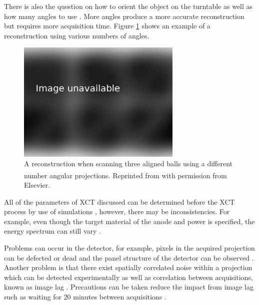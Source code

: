 There is also the question on how to orient the object on the turntable \citep{corcoran2016observations} as well as how many angles to use \citep{kruth2011computed}. More angles produce a more accurate reconstruction but requires more acquisition time. Figure \ref{fig:literature_angles} shows an example of a reconstruction using various numbers of angles.

\begin{figure}
  \centering
  \includegraphics[width=0.7\textwidth]{../figures/literatureReview/literature_angles.png}
  \caption{A reconstruction when scanning three aligned balls using a different number angular projections. Reprinted from \cite{kruth2011computed}\textsuperscript{\textcopyright} with permission from Elsevier.}
  \label{fig:literature_angles}
\end{figure}

All of the parameters of XCT discussed can be determined before the XCT process by use of simulations \citep{reisinger2011simulation, reiter2011simulation}, however, there may be inconsistencies. For example, even though the target material of the anode and power is specified, the energy spectrum can still vary \citep{stumbo2004direct}.

Problems can occur in the detector, for example, pixels in the acquired projection can be defected or dead \citep{brettschneider2014spatial} and the panel structure of the detector can be observed \citep{yang2009evaluation}. Another problem is that there exist spatially correlated noise within a projection which can be detected experimentally \citep{sun2016characterisation} as well as correlation between acquisitions, known as image lag \citep{yang2009evaluation}. Precautions can be taken reduce the impact from image lag such as waiting for 20 minutes between acquisitions \citep{yang2010noise}.

